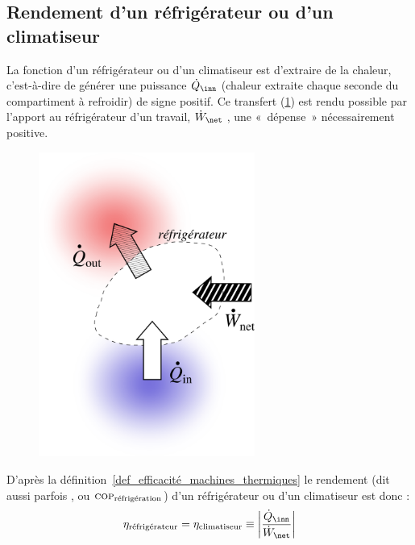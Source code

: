 	\subsection{Rendement d’un réfrigérateur ou d’un climatiseur}
	\label{ch_rendement_réfrigérateur}

		La fonction d’un réfrigérateur ou d’un climatiseur est d’extraire de la chaleur, c’est-à-dire de générer une puissance $\dot Q_\inn$ (chaleur extraite chaque seconde du compartiment à refroidir) de signe positif. Ce transfert (\cref{fig_transferts_réfrigérateur}) est rendu possible par l’apport au réfrigérateur d’un travail, $\dot W_\net$ , une «~dépense~» nécessairement positive.

		\begin{figure}
			\begin{center}
				\includegraphics[height=10cm]{images/efficacite_refrigerateur_climatiseur.png}
			\end{center}
			\label{fig_transferts_réfrigérateur}
		\end{figure}

		D’après la définition~\ref{def_efficacité_machines_thermiques} le rendement (dit aussi parfois , ou $\textsc{cop}_\text{réfrigération}$) d’un réfrigérateur ou d’un climatiseur est donc :
		\begin{equation}
			\eta_\text{réfrigérateur} = \eta _\text{climatiseur} \equiv  \left| \frac{\dot Q_\inn}{\dot W_\net} \right|
			\label{def_rendement_climatiseur_refrigerateur}
		\end{equation}

